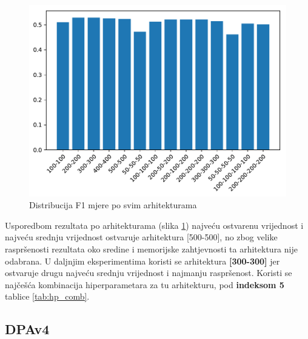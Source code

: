 \documentclass[times, utf8, numeric, diplomski]{fer}
\def\figref#1{(slika \ref{#1})}
\begin{document}
\begin{figure}[ht]
\includegraphics[width=\textwidth]{greedy_256_arch_quality.pdf}
\centering
\caption{Distribucija F1 mjere po svim arhitekturama}
\label{fig:greedy_256_arch_quality}
\end{figure}

Usporedbom rezultata po arhitekturama \figref{fig:greedy_256_arch_quality} najveću ostvarenu vrijednost i najveću srednju vrijednost ostvaruje arhitektura [500-500], no zbog velike raspršenosti rezultata oko sredine i memorijske zahtjevnosti ta arhitektura nije odabrana. U daljnjim eksperimentima koristi se arhitektura \textbf{[300-300]} jer ostvaruje drugu najveću srednju vrijednost i najmanju raspršenost. Koristi se najčešća kombinacija hiperparametara za tu arhitekturu, pod \textbf{indeksom 5} tablice \ref{tab:hp_comb}.

\clearpage

\subsection{DPAv4}
\label{sec:greedy_dpav4}
\end{document}

